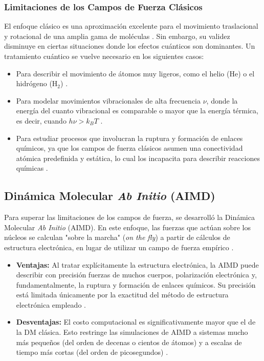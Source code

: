 \subsubsection{Limitaciones de los Campos de Fuerza Clásicos}
El enfoque clásico es una aproximación excelente para el movimiento traslacional y rotacional de una amplia gama de moléculas \cite[97]{frenkel2002understanding}. Sin embargo, su validez disminuye en ciertas situaciones donde los efectos cuánticos son dominantes. Un tratamiento cuántico se vuelve necesario en los siguientes casos:
\begin{itemize}
    \item Para describir el movimiento de átomos muy ligeros, como el helio (He) o el hidrógeno (H$_2$) \cite[97]{frenkel2002understanding}.
    \item Para modelar movimientos vibracionales de alta frecuencia $\nu$, donde la energía del cuanto vibracional es comparable o mayor que la energía térmica, es decir, cuando $h\nu > k_B T$ \cite[97]{frenkel2002understanding}.
    \item Para estudiar procesos que involucran la ruptura y formación de enlaces químicos, ya que los campos de fuerza clásicos asumen una conectividad atómica predefinida y estática, lo cual los incapacita para describir reacciones químicas \cite[R1299]{MD-2002-01}.
\end{itemize}

\subsection{Dinámica Molecular \textit{Ab Initio} (AIMD)}

Para superar las limitaciones de los campos de fuerza, se desarrolló la Dinámica Molecular \textit{Ab Initio} (AIMD). En este enfoque, las fuerzas que actúan sobre los núcleos se calculan "sobre la marcha" (\textit{on the fly}) a partir de cálculos de estructura electrónica, en lugar de utilizar un campo de fuerza empírico \cite[R1297]{MD-2002-01}.

\begin{itemize}
    \item \textbf{Ventajas:} Al tratar explícitamente la estructura electrónica, la AIMD puede describir con precisión fuerzas de muchos cuerpos, polarización electrónica y, fundamentalmente, la ruptura y formación de enlaces químicos. Su precisión está limitada únicamente por la exactitud del método de estructura electrónica empleado \cite[R1299]{MD-2002-01}.
    \item \textbf{Desventajas:} El costo computacional es significativamente mayor que el de la DM clásica. Esto restringe las simulaciones de AIMD a sistemas mucho más pequeños (del orden de decenas o cientos de átomos) y a escalas de tiempo más cortas (del orden de picosegundos) \cite[R1299]{MD-2002-01}.
\end{itemize}

